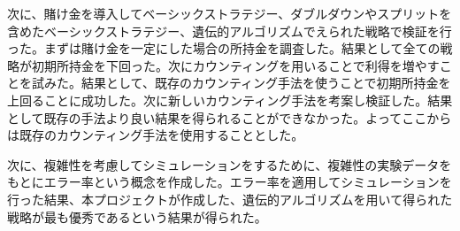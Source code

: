 次に、賭け金を導入してベーシックストラテジー、ダブルダウンやスプリットを含めたベーシックストラテジー、遺伝的アルゴリズムでえられた戦略で検証を行った。まずは賭け金を一定にした場合の所持金を調査した。結果として全ての戦略が初期所持金を下回った。次にカウンティングを用いることで利得を増やすことを試みた。結果として、既存のカウンティング手法を使うことで初期所持金を上回ることに成功した。次に新しいカウンティング手法を考案し検証した。結果として既存の手法より良い結果を得られることができなかった。よってここからは既存のカウンティング手法を使用することとした。

次に、複雑性を考慮してシミュレーションをするために、複雑性の実験データをもとにエラー率という概念を作成した。エラー率を適用してシミュレーションを行った結果、本プロジェクトが作成した、遺伝的アルゴリズムを用いて得られた戦略が最も優秀であるという結果が得られた。
